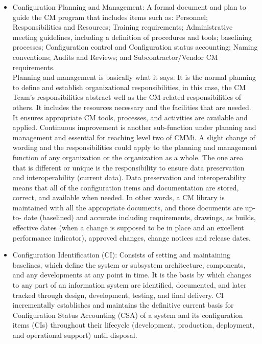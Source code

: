 \begin{itemize}
    \item Configuration Planning and Management:
    A formal document and plan to guide the CM program that includes items such as:
    Personnel; Responsibilities and Resources; Training requirements; Administrative meeting guidelines, including a definition of procedures and tools;
    baselining processes; Configuration control and Configuration status accounting; Naming conventions; Audits and Reviews; and Subcontractor/Vendor CM requirements. \\
    Planning and management is basically what it says. It is the normal planning to define and
    establish organizational responsibilities, in this case, the CM Team’s responsibilities abstract
    well as the CM-related responsibilities of others. It includes the resources necessary and
    the facilities that are needed. It ensures appropriate CM tools, processes, and activities are
    available and applied. Continuous improvement is another sub-function under planning
    and management and essential for reaching level two of CMMi. A slight change of
    wording and the responsibilities could apply to the planning and management function of
    any organization or the organization as a whole. The one area that is different or unique is
    the responsibility to ensure data preservation and interoperability (current data). Data
    preservation and interoperability means that all of the configuration items and
    documentation are stored, correct, and available when needed. In other words, a CM
    library is maintained with all the appropriate documents, and those documents are up-to-
    date (baselined) and accurate including requirements, drawings, as builds, effective dates
    (when a change is supposed to be in place and an excellent performance indicator),
    approved changes, change notices and release dates.
    \item Configuration Identification (CI):
    Consists of setting and maintaining baselines, which define the system or subsystem architecture,
    components, and any developments at any point in time. It is the basis by which changes to any part of an information system are identified, documented,
    and later tracked through design, development, testing, and final delivery. CI incrementally establishes and maintains the definitive current basis for Configuration Status Accounting (CSA)
    of a system and its configuration items (CIs) throughout their lifecycle (development, production, deployment, and operational support) until disposal. \\

\end{itemize}
